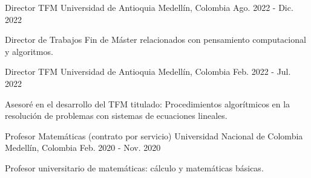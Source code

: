 
\begin{cventries}

\cventry
{Director TFM}
{Universidad de Antioquia}
{Medellín, Colombia}
{Ago. 2022 - Dic. 2022}
{
\begin{cvitems}
\item {Director de Trabajos Fin de Máster relacionados con pensamiento computacional y algoritmos.}
\end{cvitems}
}

\cventry
{Director TFM}
{Universidad de Antioquia}
{Medellín, Colombia}
{Feb. 2022 - Jul. 2022}
{
\begin{cvitems}
\item {Asesoré en el desarrollo del TFM titulado: Procedimientos algorítmicos en la resolución de problemas con sistemas de ecuaciones lineales.}
\end{cvitems}
}

\cventry
{Profesor Matemáticas (contrato por servicio)}
{Universidad Nacional de Colombia}
{Medellín, Colombia}
{Feb. 2020 - Nov. 2020}
{
\begin{cvitems}
\item {Profesor universitario de matemáticas: cálculo y matemáticas básicas.}
\end{cvitems}
}

\end{cventries}

